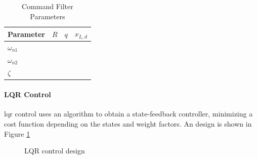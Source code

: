 \begin{table}[h!]
	\centering
	\begin{tabular}{|l|l|l|l|}
		\hline
		\textbf{Parameter}&$ R $&$ q $&$ x_{L,d} $\\
		\hline
		$ \omega_{n1} $&&&\\
		$ \omega_{n2} $&&&\\
		$ \zeta $&&&\\
		\hline
	\end{tabular}
	\caption{Command Filter Parameters}
	\label{tab:set.cf}
\end{table}



\paragraph{LQR Control}
\acf{lqr} control uses an algorithm to obtain a state-feedback controller, minimizing a cost function depending on the states and weight factors. 
An  design is shown in Figure \ref{fig:set.lqr}
\begin{figure}[h!]
	\centering
	\caption{LQR control design\label{fig:set.lqr}}
\end{figure}

